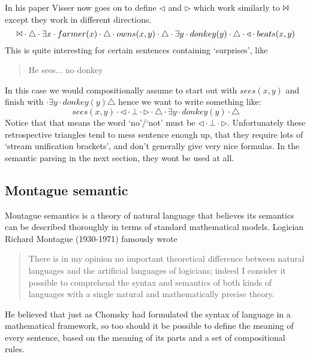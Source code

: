 \documentclass[12pt]{article}
\begin{document}
In his paper Visser now goes on to define $\triangleleft$ and $\triangleright$ which work similarly to $\Bowtie$ except they work in different directions. 
%
\begin{equation}
\Bowtie \cdot \triangle \cdot \exists x \cdot farmer(x) \cdot \triangle \cdot owns(x,y) \cdot \triangle \cdot \exists y \cdot donkey(y) \cdot \triangle \cdot \triangleleft \cdot beats(x,y)
\end{equation}
%
This is quite interesting for certain sentences containing `surprises', like
%
\begin{quotation}
He sees... no donkey
\end{quotation}
%
In this case we would compositionally assume to start out with
$sees(x,y)$ and finish with $\cdot \exists y \cdot donkey(y)\triangle$ hence we want to write something like:
%
\begin{equation}
sees(x,y) \cdot \triangleleft \cdot \bot \cdot \triangleright \cdot \triangle \cdot \exists y \cdot donkey(y) \cdot \triangle
\end{equation}
%
Notice that that means the word `no'/`not' must be $\triangleleft\cdot\bot\cdot\triangleright$. Unfortunately these retrospective triangles tend to mess sentence enough up, that they require lots of `stream unification brackets', and don't generally give very nice formulas. In the semantic parsing in the next section, they wont be used at all.

\subsection{Montague semantic}
Montague semantics is a theory of natural language that believes its semantics can be described thoroughly in terms of standard mathematical models. Logician Richard Montague (1930-1971) famously wrote
\begin{quotation}
There is in my opinion no important theoretical difference between natural languages and the artificial languages of logicians; indeed I consider it possible to comprehend the syntax and semantics of both kinds of languages with a single natural and mathematically precise theory. \cite{montague1970universal}
\end{quotation}

He believed that just as Chomsky had formulated the syntax of language in a mathematical framework, so too should it be possible to define the meaning of every sentence, based on the meaning of its parts and a set of compositional rules.
\end{document}
